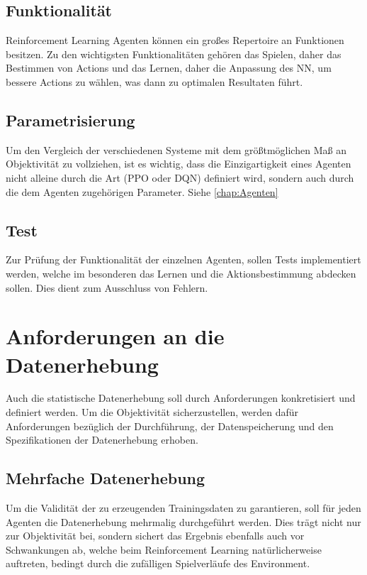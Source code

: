 \subsection{Funktionalität}
Reinforcement Learning Agenten können ein großes Repertoire an Funktionen besitzen. Zu den wichtigsten Funktionalitäten gehören das Spielen, daher das Bestimmen von Actions und das Lernen, daher die Anpassung des NN, um bessere Actions zu wählen, was dann zu optimalen Resultaten führt.

\subsection{Parametrisierung}
Um den Vergleich der verschiedenen Systeme mit dem größtmöglichen Maß an Objektivität zu vollziehen, ist es wichtig, dass die Einzigartigkeit eines Agenten nicht alleine durch die Art (PPO oder DQN) definiert wird, sondern auch durch die dem Agenten zugehörigen Parameter. Siehe \ref{chap:Agenten}

\subsection{Test}
Zur Prüfung der Funktionalität der einzelnen Agenten, sollen Tests implementiert werden, welche im besonderen das Lernen und die Aktionsbestimmung abdecken sollen. Dies dient zum Ausschluss von Fehlern.

\section{Anforderungen an die Datenerhebung}
Auch die statistische Datenerhebung soll durch Anforderungen konkretisiert und definiert werden. Um die Objektivität sicherzustellen, werden dafür Anforderungen bezüglich der Durchführung, der Datenspeicherung und den Spezifikationen der Datenerhebung erhoben.

\subsection{Mehrfache Datenerhebung}
Um die Validität der zu erzeugenden Trainingsdaten zu garantieren, soll für jeden Agenten die Datenerhebung mehrmalig durchgeführt werden. Dies trägt nicht nur zur Objektivität bei, sondern sichert das Ergebnis ebenfalls auch vor Schwankungen ab, welche beim Reinforcement Learning natürlicherweise auftreten, bedingt durch die zufälligen Spielverläufe des Environment.

